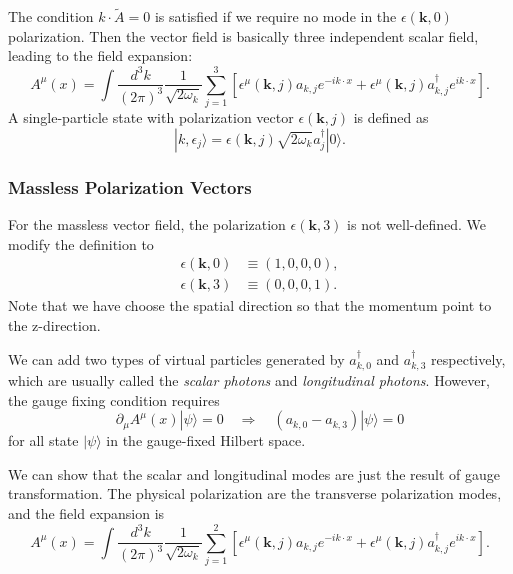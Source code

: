 The condition $k \cdot \tilde A = 0$ is satisfied if we require no mode in the $\epsilon(\bm k, 0)$ polarization.
Then the vector field is basically three independent scalar field, leading to the  field expansion:
\begin{equation}
	A^\mu(x) = \int \frac{d^{3} k}{(2\pi)^{3}}\frac{1}{\sqrt{2\omega_k}}
	\sum_{j=1}^3 \left[\epsilon^\mu(\bm k, j) a_{k,j} e^{-ik\cdot x} + 
	\epsilon^{\mu}(\bm k, j) a^\dagger_{k,j} e^{ik\cdot x}\right].
\end{equation}
A single-particle state with polarization vector $\epsilon(\bm k, j)$ is defined as
\begin{equation}
	|k,\epsilon_j\rangle = \epsilon(\bm k, j) \sqrt{2\omega_k} a^\dagger_{j}|0\rangle.
\end{equation}


\subsubsection{Massless Polarization Vectors}

For the massless vector field, the polarization $\epsilon(\bm k, 3)$ is not well-defined.
We modify the definition to
\begin{equation}
\begin{aligned}
	\epsilon(\bm k, 0) &\equiv (1,0,0,0), \\
	\epsilon(\bm k, 3) &\equiv (0,0,0,1).
\end{aligned}
\end{equation}
Note that we have choose the spatial direction so that the momentum point to the z-direction.

We can add two types of virtual particles generated by $a^\dagger_{k,0}$ and $a^\dagger_{k,3}$ respectively, which are usually called the \textit{scalar photons} and \textit{longitudinal photons}.
However, the gauge fixing condition requires
\begin{equation}
	\partial_\mu A^\mu(x)|\psi\rangle = 0 \quad \Longrightarrow \quad
	(a_{k,0}-a_{k,3})|\psi\rangle = 0
\end{equation}
for all state $|\psi\rangle$ in the gauge-fixed Hilbert space.

We can show that the scalar and longitudinal modes are just the result of gauge transformation.
The physical polarization are the transverse polarization modes, and the field expansion is
\begin{equation}
	A^\mu(x) = \int \frac{d^{3} k}{(2\pi)^{3}}\frac{1}{\sqrt{2\omega_k}}
	\sum_{j=1}^2 \left[\epsilon^\mu(\bm k, j) a_{k,j} e^{-ik\cdot x} + 
	\epsilon^{\mu}(\bm k, j) a^\dagger_{k,j} e^{ik\cdot x}\right].
\end{equation}


